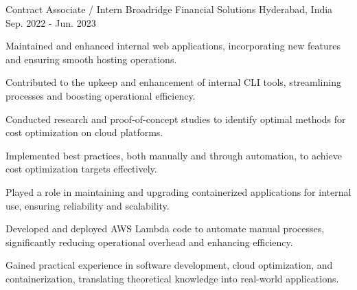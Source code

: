 \begin{cventries}
  \cventry
    {Contract Associate / Intern} %
    {Broadridge Financial Solutions} %
    {Hyderabad, India} %
    {Sep. 2022 - Jun. 2023} %
    {
      \begin{cvitems} %
        \item {Maintained and enhanced internal web applications, incorporating new features and ensuring smooth hosting operations.}
        \item {Contributed to the upkeep and enhancement of internal CLI tools, streamlining processes and boosting operational efficiency.}
        \item {Conducted research and proof-of-concept studies to identify optimal methods for cost optimization on cloud platforms.}
        \item {Implemented best practices, both manually and through automation, to achieve cost optimization targets effectively.}
        \item {Played a role in maintaining and upgrading containerized applications for internal use, ensuring reliability and scalability.}
        \item {Developed and deployed AWS Lambda code to automate manual processes, significantly reducing operational overhead and enhancing efficiency.}
        \item {Gained practical experience in software development, cloud optimization, and containerization, translating theoretical knowledge into real-world applications.}
        \end{cvitems}
    }

\end{cventries}
